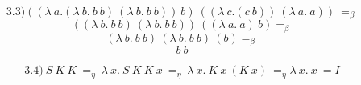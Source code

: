\documentclass[12pt]{article}
\begin{document}
$$
3.3) ((\lambda\ a.(\lambda\ b.\ b\ b)\ (\lambda\ b.\ b\ b))\ b)\ ((\lambda\ c.(c\ b))\ (\lambda\ a.\ a))\ =_\beta
$$$$
((\lambda\ b.\ b\ b)\ (\lambda\ b.\ b\ b))\ ((\lambda\ a.\ a)\ b) =_\beta$$
$$
(\lambda\ b.\ b\ b)\ (\lambda\ b.\ b\ b)\ (b) =_\beta$$
$$
b\ b
$$

$$
3.4)\ S\ K\ K\ =_\eta\ \lambda\ x.\ S\ K\ K\ x\ =_\eta\ \lambda\ x.\ K\ x\ (K\ x)\ =_\eta \lambda\ x.\ x\ = I
$$
\end{document}
